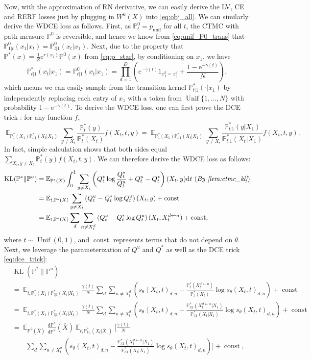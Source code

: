 \documentclass{article}
\theoremstyle{remark}
\newcommand{\ro}[1]{\left(#1\right)} %
\newcommand{\e}{\mathrm{e}}
\newcommand{\const}{\operatorname{const}}
\renewcommand{\P}{\mathbb{P}}
\newcommand{\E}{\operatorname{\mathbb{E}}}
\newcommand{\unif}{\operatorname{Unif}}
\renewcommand{\d}{\mathrm{d}}
\newcommand{\de}[2]{\frac{\mathrm{d}#1}{\mathrm{d}#2}} %
\newcommand{\kl}{\operatorname{KL}}
\newcommand{\ub}{{\bar{u}}}
\newcommand{\gammab}{{\overline{\gamma}}}
\newcommand{\Xb}{\overline{X}}
\newcommand{\punif}{p_\mathrm{unif}}
\begin{document}
Now, with the approximation of RN derivative, we can easily derive the LV, CE and RERF losses just by plugging in $W^u(X)$ into \cref{eq:obj_all}. We can similarly derive the WDCE loss as follows. First, as $\P^0_t=\punif$ for all $t$, the CTMC with path measure $\P^0$ is reversible, and hence we know from \cref{eq:unif_P0_trans} that $\P^0_{1|t}(x_1|x_t)=\P^0_{t|1}(x_t|x_1)$. Next, due to the property that $\P^*(x)=\frac{1}{Z}\e^{r(x_1)}\P^0(x)$ from \cref{eq:p_star}, by conditioning on $x_1$, we have 
\begin{equation}
    \P^*_{t|1}(x_t|x_1)=\P^0_{t|1}(x_t|x_1)=\prod_{d=1}^{D}\ro{\e^{-\gammab(t)}1_{x_1^d=x_t^d}+\frac{1-\e^{-\gammab(t)}}{N}},
    \label{eq:unif_p_star_trans}
\end{equation}
which means we can easily sample from the transition kernel $\P^*_{t|1}(\cdot|x_1)$ by independently replacing each entry of $x_1$ with a token from $\unif\{1,...,N\}$ with probability $1-\e^{-\gammab(t)}$. To derive the WDCE loss, one can first prove the DCE trick \cite[Thm. 3.4]{lou2024discrete}: for any function $f$,
\begin{equation}
    \E_{\P^*_1(X_1)\P^*_{t|1}(X_t|X_1)}\sum_{y\ne X_t}\frac{\P^*_t(y)}{\P^*_t(X_t)}f(X_t,t,y)=\E_{\P^*_1(X_1)\P^*_{t|1}(X_t|X_1)}\sum_{y\ne X_t}\frac{\P^*_{t|1}(y|X_1)}{\P^*_{t|1}(X_t|X_1)}f(X_t,t,y).
    \label{eq:dce_trick}
\end{equation}
In fact, simple calculation shows that both sides equal $\sum_{X_t,y\ne X_t}\P^*_t(y)f(X_t,t,y)$. We can therefore derive the WDCE loss as follows:
\begin{align*}
    \kl(\P^*\|\P^u)&=\E_{\P^*(X)}\int_0^1\sum_{y\ne X_t}\ro{Q^*_t\log\frac{Q^*_t}{Q^u_t}+Q^u_t-Q^*_t}(X_t,y)\d t~(\textit{By \cref{lem:ctmc_kl}})\\
    &=\E_{t,\P^*(X)}\sum_{y\ne X_t}\ro{Q^u_t-Q^*_t\log Q^u_t}(X_t,y)+\const\\
    &=\E_{t,\P^*(X)}\sum_{d}\sum_{n\ne X_t^d}\ro{Q^u_t-Q^*_t\log Q^u_t}(X_t,X_t^{d\gets n})+\const,
\end{align*}
where $t\sim\unif(0,1)$, and $\const$ represents terms that do not depend on $\theta$. Next, we leverage the parameterization of $Q^u$ and $Q^*$ as well as the DCE trick \cref{eq:dce_trick}:
\begin{align*}
    &\kl(\P^*\|\P^u)\\
    &=\E_{t,\P^*_1(X_1)\P^*_{t|1}(X_t|X_1)}\frac{\gamma(t)}{N}\sum_d\sum_{n\ne X_t^d}\ro{s_\theta(X_t,t)_{d,n}-\frac{\P^*_t(X_t^{d\gets n})}{\P^*_t(X_t)}\log s_\theta(X_t,t)_{d,n}}+\const\\
    &=\E_{t,\P^*_1(X_1)\P^*_{t|1}(X_t|X_1)}\frac{\gamma(t)}{N}\sum_{d}\sum_{n\ne X_t^d}\ro{s_\theta(X_t,t)_{d,n}-\frac{\P^*_{t|1}(X_t^{d\gets n}|X_1)}{\P^*_{t|1}(X_t|X_1)}\log s_\theta(X_t,t)_{d,n}}+\const\\
    &=\E_{\P^\ub(\Xb)}\de{\P^*}{\P^\ub}(\Xb)\E_{t,\P^*_{t|1}(X_t|\Xb_1)}\Bigg[\frac{\gamma(t)}{N}\\
    &\qquad\sum_{d}\sum_{n\ne X_t^d}\ro{s_\theta(X_t,t)_{d,n}-\frac{\P^*_{t|1}(X_t^{d\gets n}|\Xb_1)}{\P^*_{t|1}(X_t|\Xb_1)}\log s_\theta(X_t,t)_{d,n}}\Bigg]+\const,
\end{align*}
\end{document}
